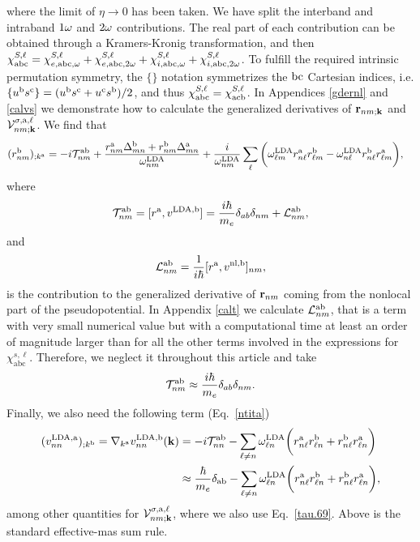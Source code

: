 \documentclass[floatfix,prb,aps,superscriptaddress,11pt,preprint,letterpaper]{revtex4}
\begin{document}
where the limit of $\eta\to 0$ has been taken.
We have split the interband and intraband $1\omega$ and $2\omega$
contributions. The real part of each contribution can be obtained through
a Kramers-Kronig transformation,\cite{nicolas} and then
$\chi^{S,\ell}_{\mathrm{a}\mathrm{b}\mathrm{c}}=\chi^{S,\ell}_{e,\mathrm{a}\mathrm{b}\mathrm{c},\omega} 
+\chi^{S,\ell}_{e,\mathrm{a}\mathrm{b}\mathrm{c},2\omega}+\chi^{S,\ell}_{i,\mathrm{a}\mathrm{b}\mathrm{c},\omega}
+\chi^{S,\ell}_{i,\mathrm{a}\mathrm{b}\mathrm{c},2\omega}
$.
To fulfill the required intrinsic permutation symmetry,\cite{rashkeevPRB98} 
the $\{\}$ notation symmetrizes the $\mathrm{b}\mathrm{c}$ Cartesian indices, i.e. 
$\{u^{\mathrm{b}}s^{\mathrm{c}}\}=(u^{\mathrm{b}}s^{\mathrm{c}}+u^{\mathrm{c}}s^{\mathrm{b}})/2$,
and thus
$\chi_{\mathrm{a}\mathrm{b}\mathrm{c}}^{S,\ell}=\chi_{\mathrm{a}\mathrm{c}\mathrm{b}}^{S,\ell}$.
In Appendices \ref{gdernl} and \ref{calvs} we demonstrate how to calculate  
the generalized derivatives of $\mathbf{r}_{nm;\mathbf{k}}$ and
${\mathbf{\cal V}}^{\sigma,\mathrm{a},\ell}_{nm;\mathbf{k}}$. 
We find that
\begin{align}\label{rgen.69}
(r^{\mathrm{b}}_{nm})_{;k^{\mathrm{a}}}
&=
-i{\cal T}^{\mathrm{a}\mathrm{b}}_{nm}
+
\frac{
r^{\mathrm{a}}_{nm}
\Delta^{\mathrm{b}}_{mn}
+r^{\mathrm{b}}_{nm}
\Delta^{\mathrm{a}}_{mn}
}
{\omega^{\mathrm{LDA}}_{nm}}
+
\frac{i}{\omega^{\mathrm{LDA}}_{nm}}
\sum_{\ell}
\bigg(
\omega^{\mathrm{LDA}}_{\ell m}
r^{\mathrm{a}}_{n\ell}
r^{\mathrm{b}}_{\ell m}
-
\omega^{\mathrm{LDA}}_{n\ell}
r^{\mathrm{b}}_{n\ell}
r^{\mathrm{a}}_{\ell m}
\bigg)
,
\end{align}
where
\begin{align}\label{tau.1}
{\cal T}_{nm}^{\mathrm{a}\mathrm{b}}
=
[r^{\mathrm{a}},v^{\mathrm{LDA},\mathrm{b}}]= 
\frac{i\hbar}{m_e}\delta_{ab}\delta_{nm}+
{\cal L}_{nm}^{\mathrm{a}\mathrm{b}}
,
\end{align}  
and
\begin{align}\label{tau.2}
{\cal L}_{nm}^{\mathrm{a}\mathrm{b}}
=
\frac{1}{i\hbar}[r^{\mathrm{a}},v^{\mathrm{nl},\mathrm{b}}]_{nm}
,
\end{align}
is the contribution to the generalized derivative of $\mathbf{r}_{nm}$
coming from the nonlocal part of the pseudopotential.
In Appendix \ref{calt} we calculate
${\cal L}^{\mathrm{a}\mathrm{b}}_{nm}$, that
is a term with very small numerical value but with a computational time 
at least an order of magnitude larger
than for all the other terms involved in the expressions for 
$\chi^{s,\ell}_{\mathrm{abc}}$.\cite{valerie}
Therefore, we neglect it throughout this article and take
\begin{align}\label{tau.69}
{\cal T}_{nm}^{\mathrm{a}\mathrm{b}}
\approx
\frac{i\hbar}{m_e}\delta_{ab}\delta_{nm}
.
\end{align} 
Finally,
we also need the following term (Eq.~\eqref{ntita})
\begin{align}\label{a.3c}
(v^{\mathrm{LDA},\mathrm{a}}_{nn})_{;k^{\mathrm{b}}}
=
\nabla_{k^{\mathrm{a}}}  
v^{\mathrm{LDA},\mathrm{b}}_{nn}(\mathbf{k})
&=
-i{\cal T}^{\mathrm{a}\mathrm{b}}_{nn}
-
\sum_{\ell\ne n}
\omega^{\mathrm{LDA}}_{\ell n}
\bigg(  
r^{\mathrm{a}}_{n\ell}  
r^{\mathrm{b}}_{\ell n}
+  
r^{\mathrm{b}}_{n\ell}  
r^{\mathrm{a}}_{\ell n}
\bigg)
\nonumber\\
&\approx
\frac{\hbar}{m_e}\delta_{\mathrm{a}\mathrm{b}}
-
\sum_{\ell\ne n}
\omega^{\mathrm{LDA}}_{\ell n}
\bigg(  
r^{\mathrm{a}}_{n\ell}  
r^{\mathrm{b}}_{\ell n}
+  
r^{\mathrm{b}}_{n\ell}  
r^{\mathrm{a}}_{\ell n}
\bigg)
,
\end{align}  
among other quantities for ${\mathbf{\cal V}}^{\sigma,\mathrm{a},\ell}_{nm;\mathbf{k}}$, where we 
also use Eq.~\eqref{tau.69}. Above is the standard effective-mas sum rule.
\cite{ashcroft_solid_1976} 
\end{document}
